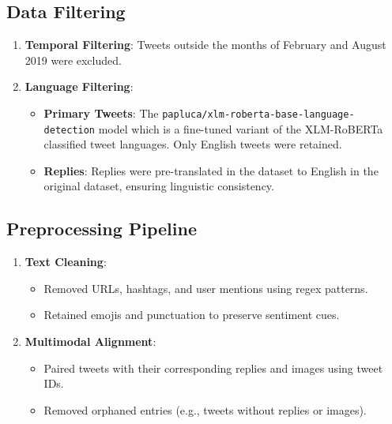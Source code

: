\subsection{Data Filtering}
\begin{enumerate}
    \item \textbf{Temporal Filtering}: Tweets outside the months of February and August 2019 were excluded.
    \item \textbf{Language Filtering}:
    \begin{itemize}
        \item \textbf{Primary Tweets}: The \texttt{papluca/xlm-roberta-base-language-detection} model which is a fine-tuned variant of the XLM-RoBERTa \cite{DBLP:journals/corr/abs-1911-02116} classified tweet languages. Only English tweets were retained.
        \item \textbf{Replies}: Replies were pre-translated in the dataset to English in the original dataset, ensuring linguistic consistency.
    \end{itemize}
\end{enumerate}

\subsection{Preprocessing Pipeline}
\begin{enumerate}
    \item \textbf{Text Cleaning}:
    \begin{itemize}
        \item Removed URLs, hashtags, and user mentions using regex patterns.
        \item Retained emojis and punctuation to preserve sentiment cues.
    \end{itemize}
    \item \textbf{Multimodal Alignment}:
    \begin{itemize}
        \item Paired tweets with their corresponding replies and images using tweet IDs.
        \item Removed orphaned entries (e.g., tweets without replies or images).
    \end{itemize}
\end{enumerate}

